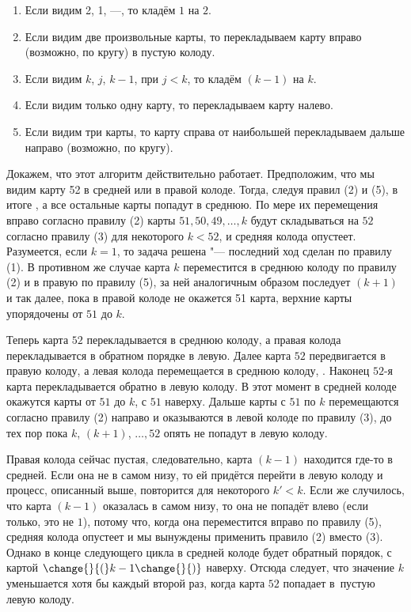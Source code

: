 \documentclass[twoside]{book}
\begin{document}
\begin{enumerate}[label=(\arabic*),noitemsep,leftmargin=\parindent,labelsep=3.5pt]
\item Если видим 2, 1, ---, то кладём $1$ на $2$.
\item Если видим две произвольные карты,  то перекладываем карту вправо (возможно, по кругу) в пустую колоду.
\item Если видим $k$, $j$, $k-1$, при $j < k$, то кладём $(k-1)$ на $k$.
\item Если видим только одну карту, то перекладываем карту налево.
\item Если видим три карты, то карту справа от наибольшей перекладываем дальше направо (возможно, по кругу).
\end{enumerate}

Докажем, что этот алгоритм действительно работает.
Предположим, что мы видим карту 52 в средней или в правой колоде.
Тогда, следуя правил (2) и (5),  в итоге , а все остальные карты попадут в среднюю.
По мере их перемещения вправо согласно правилу (2) карты $51, 50, 49, \dots, k$ будут складываться на $52$ согласно правилу (3) для некоторого $k < 52$, и средняя колода опустеет.
Разумеется, если $k = 1$, то задача решена "--- последний ход сделан по правилу (1).
В противном же случае карта $k$ переместится в среднюю колоду по правилу (2) и в правую по правилу (5), за ней аналогичным образом последует $(k+1)$ и так далее, пока в правой колоде не окажется 51 карта,  верхние карты упорядочены от $51$ до $k$.

Теперь карта $52$ перекладывается в среднюю колоду,
а правая колода перекладывается в обратном порядке в левую.
Далее карта $52$ передвигается в правую колоду, а левая колода перемещается в среднюю колоду, .
Наконец $52$-я карта перекладывается обратно в левую колоду.
В этот момент в средней колоде окажутся карты от $51$ до $k$, с $51$ наверху.
Дальше карты с $51$ по $k$ перемещаются согласно правилу (2) направо и оказываются в левой колоде по правилу (3), до тех пор пока $k$, $(k+1)$, $\dots, 52$ опять не попадут в левую колоду.

Правая колода сейчас пустая, следовательно,  карта $(k-1)$ находится где-то в средней.
Если она не в самом низу, то ей придётся перейти в левую колоду и процесс, описанный выше, повторится для некоторого $k'<k$.
Если же случилось, что карта $(k-1)$ оказалась в самом низу, то она не попадёт влево (если только, это не $1$), потому что, когда она переместится вправо по правилу (5), средняя колода опустеет и мы вынуждены  применить правило (2) вместо (3).
Однако в конце следующего цикла в средней колоде будет обратный порядок, с картой $\change{}{(}k-1\change{}{)}$ наверху.
Отсюда следует, что значение $k$ уменьшается хотя бы каждый второй раз, когда карта $52$ попадает в~пустую левую колоду.
\end{document}
